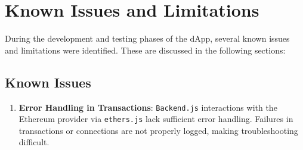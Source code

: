 \documentclass[../main.tex]{subfiles}
\begin{document}
\section{Known Issues and Limitations}

During the development and testing phases of the dApp, several known issues and limitations were identified. These are discussed in the following sections:

\subsection{Known Issues}

\begin{enumerate}
    \item \textbf{Error Handling in Transactions}: \texttt{Backend.js} interactions with the Ethereum provider via \texttt{ethers.js} lack sufficient error handling. Failures in transactions or connections are not properly logged, making troubleshooting difficult.



    

    

\end{enumerate}
\end{document}

